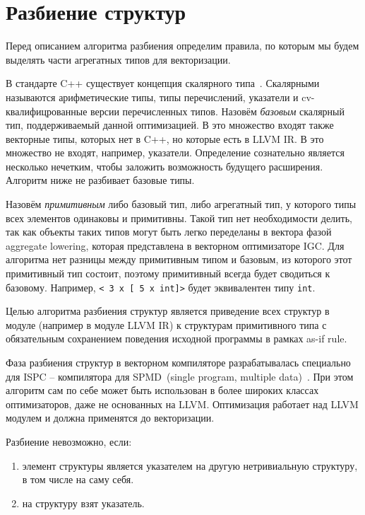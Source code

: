 \section{Разбиение структур}
\label{sec:Background}

Перед описанием алгоритма разбиения определим правила, по которым мы будем выделять части агрегатных типов для векторизации.

В стандарте C++ существует концепция скалярного типа~\cite{ISO}.
Скалярными называются арифметические типы, типы перечислений, указатели и cv-квалифицрованные версии перечисленных типов.
Назовём \emph{базовым} скалярный тип, поддерживаемый данной оптимизацией.
В это множество входят также векторные типы, которых нет в C++, но которые есть в LLVM IR. 
В это множество не входят, например, указатели.
Определение сознательно является несколько нечетким, чтобы заложить возможность будущего расширения.
Алгоритм ниже не разбивает базовые типы.

Назовём \emph{примитивным} либо базовый тип, либо агрегатный тип, у которого типы всех элементов одинаковы и примитивны.
Такой тип нет необходимости делить, так как объекты таких типов могут быть легко переделаны в вектора фазой aggregate lowering, которая представлена в векторном оптимизаторе IGC.
Для алгоритма нет разницы между примитивным типом и базовым, из которого этот примитивный тип состоит, поэтому примитивный всегда будет сводиться к базовому. Например, \verb|< 3 x [ 5 x int]>| будет эквивалентен типу \verb|int|.

Целью алгоритма разбиения структур является приведение всех структур в модуле (например в модуле LLVM IR) к структурам примитивного типа с обязательным сохранением поведения исходной программы в рамках as-if rule.

Фаза разбиения структур в векторном компиляторе разрабатывалась специально для ISPC -- компилятора для SPMD~(single program, multiple data)~\cite{ISPC}.
При этом алгоритм сам по себе может быть использован в более широких классах оптимизаторов, даже не основанных на LLVM.
Оптимизация работает над LLVM модулем и должна применятся до векторизации.

Разбиение невозможно, если:
\begin{enumerate}
\item элемент структуры является указателем на другую нетривиальную структуру, в том числе на саму себя.
\item на структуру взят указатель.
\end{enumerate}

